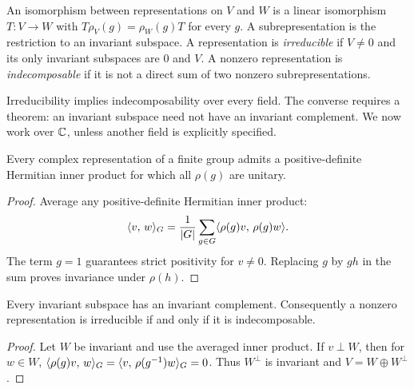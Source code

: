 \begin{defn}
\label{defn-representation-isomorphs}\label{defn-sub-representation}
An isomorphism between representations on $V$ and $W$ is a linear
isomorphism $T:V\to W$ with $T\rho_V(g)=\rho_W(g)T$ for every $g$.
A subrepresentation is the restriction to an invariant subspace.
A representation is \emph{irreducible} if $V\ne0$ and its only invariant
subspaces are $0$ and $V$. A nonzero representation is
\emph{indecomposable} if it is not a direct sum of two nonzero
subrepresentations.
\end{defn}
Irreducibility implies indecomposability over every field. The converse
requires a theorem: an invariant subspace need not have an invariant
complement. We now work over $\mathbb{C}$, unless another field is explicitly
specified.


\begin{prop}
\label{unit-representation-prop}
Every complex representation of a finite group admits a positive-definite
Hermitian inner product for which all $\rho(g)$ are unitary.
\end{prop}
\begin{proof}
Average any positive-definite Hermitian inner product:
\[
 \langle v,\,w\rangle_G=\frac1{|G|}\sum_{g\in G}
                         \langle \rho(g)v,\,\rho(g)w\rangle.
\]
The term $g=1$ guarantees strict positivity for $v\ne0$. Replacing
$g$ by $gh$ in the sum proves invariance under $\rho(h)$.
\end{proof}


\begin{thm}
\label{thm-decomposition-irreducible}
Every invariant subspace has an invariant complement. Consequently a
nonzero representation is irreducible if and only if it is indecomposable.
\end{thm}
\begin{proof}
Let $W$ be invariant and use the averaged inner product. If $v\perp W$,
then for $w\in W$,
$\langle \rho(g)v,\,w\rangle_G=\langle v,\,\rho(g^{-1})w\rangle_G=0$.
Thus $W^\perp$ is invariant and $V=W\oplus W^\perp$.
\end{proof}


